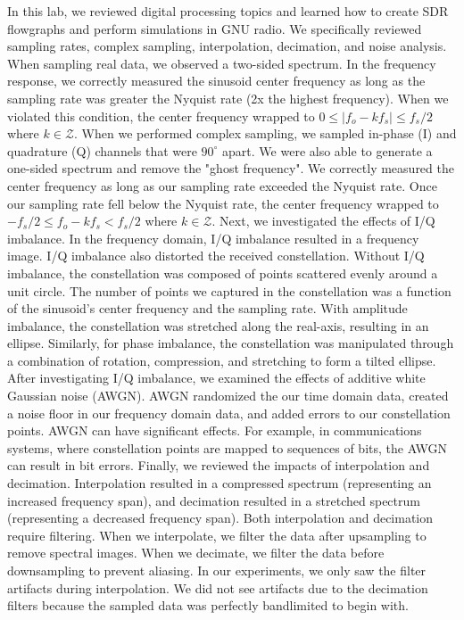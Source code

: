 \documentclass{article}
\begin{document}
In this lab, we reviewed digital processing topics and learned how to create SDR flowgraphs and perform simulations in GNU radio. We specifically reviewed sampling rates, complex sampling, interpolation, decimation, and noise analysis. When sampling real data, we observed a two-sided spectrum. In the frequency response, we correctly measured the sinusoid center frequency as long as the sampling rate was greater the Nyquist rate (2x the highest frequency). When we violated this condition, the center frequency wrapped to $0 \leq |f_o - kf_s| \leq f_s/2$ where $k \in \mathcal{Z}$. When we performed complex sampling, we sampled in-phase (I) and quadrature (Q) channels that were $90^\circ$ apart. We were also able to generate a one-sided spectrum and remove the "ghost frequency". We correctly measured the center frequency as long as our sampling rate exceeded the Nyquist rate. Once our sampling rate fell below the Nyquist rate, the center frequency wrapped to $-f_s/2 \leq f_o - kf_s < f_s/2$ where $k \in \mathcal{Z}$. Next, we investigated the effects of I/Q imbalance. In the frequency domain, I/Q imbalance resulted in a frequency image. I/Q imbalance also distorted the received constellation. Without I/Q imbalance, the constellation was composed of points scattered evenly around a unit circle. The number of points we captured in the constellation was a function of the sinusoid's center frequency and the sampling rate. With amplitude imbalance, the constellation was stretched along the real-axis, resulting in an ellipse. Similarly, for phase imbalance, the constellation was manipulated through a combination of rotation, compression, and stretching to form a tilted ellipse.  After investigating I/Q imbalance, we examined the effects of additive white Gaussian noise (AWGN). AWGN randomized the our time domain data, created a noise floor in our frequency domain data, and added errors to our constellation points. AWGN can have significant effects. For example, in communications systems, where constellation points are mapped to sequences of bits, the AWGN can result in bit errors. Finally, we reviewed the impacts of interpolation and decimation. Interpolation resulted in a compressed spectrum (representing an increased frequency span), and decimation resulted in a stretched spectrum (representing a decreased frequency span). Both interpolation and decimation require filtering. When we interpolate, we filter the data after upsampling to remove spectral images. When we decimate, we filter the data before downsampling to prevent aliasing. In our experiments, we only saw the filter artifacts during interpolation. We did not see artifacts due to the decimation filters because the sampled data was perfectly bandlimited to begin with.
\end{document}
